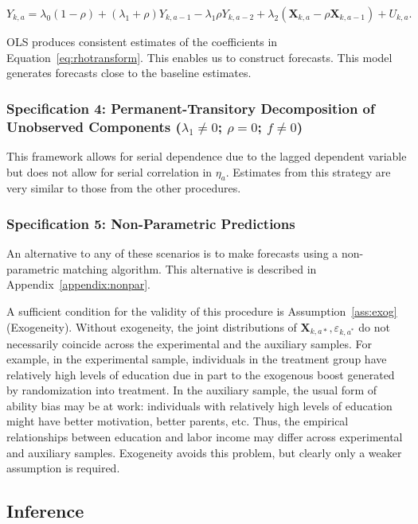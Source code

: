 \begin{equation}
Y_{k,a} = \lambda_{0} \left( 1 - \rho \right) + \left( \lambda_{1} + \rho \right) Y_{k,a-1} - \lambda_{1} \rho Y_{k,a-2} + \lambda_{2} \left( \bm{X}_{k,a} - \rho \bm{X}_{k,a-1}  \right) + U_{k,a}. \label{eq:rhotransform}
\end{equation}

OLS produces consistent estimates of the coefficients in Equation~\eqref{eq:rhotransform}. This enables us to construct forecasts. This model generates forecasts close to the baseline estimates.

\subsubsection{Specification 4: Permanent-Transitory Decomposition of Unobserved Components ($\lambda_{1} \neq 0$; $\rho = 0$; $f \neq 0$)} \label{app:permtrans}

This framework allows for serial dependence due to the lagged dependent variable but does not allow for serial correlation in $\eta_{a}$. Estimates from this strategy are very similar to those from the other procedures.

\subsubsection{Specification 5: Non-Parametric Predictions}

An alternative to any of these scenarios is to make forecasts using a non-parametric matching algorithm. This alternative is described in Appendix~\ref{appendix:nonpar}.

A sufficient condition for the validity of this procedure is Assumption~\ref{ass:exog} (Exogeneity). Without exogeneity, the joint distributions of $\bm{X}_{k,a*}, \varepsilon_{k,a^*}$ do not necessarily coincide across the experimental and the auxiliary samples. For example, in the experimental sample, individuals in the treatment group have relatively high levels of education due in part to the exogenous boost generated by randomization into treatment. In the auxiliary sample, the usual form of ability bias may be at work: individuals with relatively high levels of education might have better motivation, better parents, etc. Thus, the empirical relationships between education and labor income may differ across experimental and auxiliary samples. Exogeneity avoids this problem, but clearly only a weaker assumption is required.

\subsection{Inference} \label{appendix:bootstrap}

